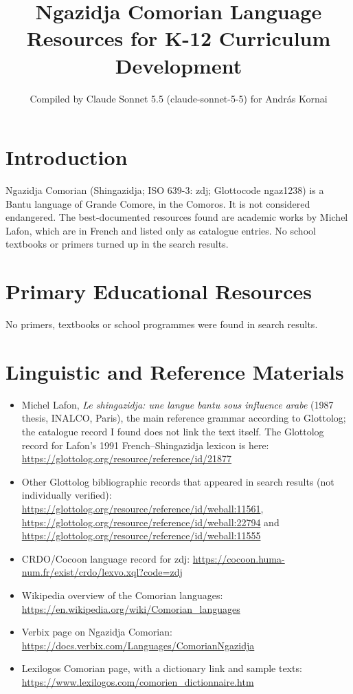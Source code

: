 \documentclass[12pt]{article}
\title{Ngazidja Comorian Language Resources for K-12 Curriculum Development}
\author{Compiled by Claude Sonnet 5.5 (claude-sonnet-5-5) for Andr\'as Kornai}
\date{}
\begin{document}
\maketitle

\section{Introduction}
Ngazidja Comorian (Shingazidja; ISO 639-3: zdj; Glottocode ngaz1238) is a Bantu language of Grande Comore, in the Comoros. It is not considered endangered. The best-documented resources found are academic works by Michel Lafon, which are in French and listed only as catalogue entries. No school textbooks or primers turned up in the search results.

\section{Primary Educational Resources}
No primers, textbooks or school programmes were found in search results.

\section{Linguistic and Reference Materials}
\begin{itemize}
\item Michel Lafon, \emph{Le shingazidja: une langue bantu sous influence arabe} (1987 thesis, INALCO, Paris), the main reference grammar according to Glottolog; the catalogue record I found does not link the text itself. The Glottolog record for Lafon's 1991 French--Shingazidja lexicon is here: \url{https://glottolog.org/resource/reference/id/21877}
\item Other Glottolog bibliographic records that appeared in search results (not individually verified): \url{https://glottolog.org/resource/reference/id/weball:11561}, \url{https://glottolog.org/resource/reference/id/weball:22794} and \url{https://glottolog.org/resource/reference/id/weball:11555}
\item CRDO/Cocoon language record for zdj: \url{https://cocoon.huma-num.fr/exist/crdo/lexvo.xql?code=zdj}
\item Wikipedia overview of the Comorian languages: \url{https://en.wikipedia.org/wiki/Comorian_languages}
\item Verbix page on Ngazidja Comorian: \url{https://docs.verbix.com/Languages/ComorianNgazidja}
\item Lexilogos Comorian page, with a dictionary link and sample texts: \url{https://www.lexilogos.com/comorien_dictionnaire.htm}
\end{itemize}
\end{document}

